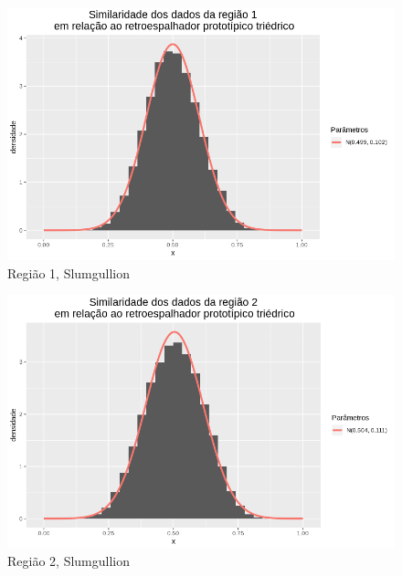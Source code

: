 \documentclass[12pt]{article}
\begin{document}
\begin{figure}[!h]
    \centering
    \vspace{0.1\linewidth}
    \includegraphics[width = \linewidth]{../../Images/Report_18_12_20/slum_tri_region1.png}
    \caption{Região 1, Slumgullion}
    \label{fig:slum_tri_r1}
\end{figure}

\begin{figure}[!h]
    \centering
    \vspace{0.1\linewidth}
    \includegraphics[width = \linewidth]{../../Images/Report_18_12_20/slum_tri_region2.png}
    \caption{Região 2, Slumgullion}
    \label{fig:slum_tri_r2}
\end{figure}
\end{document}
